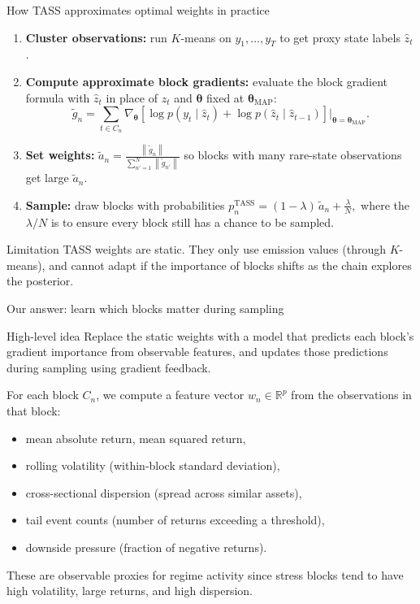 \documentclass[aspectratio=169]{beamer}
\newcommand{\norm}[1]{\left\lVert #1 \right\rVert}
\newcommand{\btheta}{\boldsymbol{\theta}}
\begin{document}
\begin{frame}{How TASS approximates optimal weights in practice}
  \begin{enumerate}
    \item \textbf{Cluster observations:} run $K$-means on $y_1, \ldots, y_T$ to get proxy state labels $\hat{z}_t$. 
    \item \textbf{Compute approximate block gradients:} evaluate the block gradient formula with $\hat{z}_t$ in place of $z_t$ and $\btheta$ fixed at $\btheta_{\mathrm{MAP}}$:
      \[
        \tilde{g}_n = \sum_{t \in C_n} \nabla_{\btheta} \left[\log p(y_t \mid \hat{z}_t) + \log p(\hat{z}_t \mid \hat{z}_{t-1})\right]\bigg|_{\btheta = \btheta_{\mathrm{MAP}}}.
      \]
    \item \textbf{Set weights:}
      $\displaystyle\tilde{a}_n = \frac{\norm{\tilde{g}_n}}{\sum_{n'=1}^{N}\norm{\tilde{g}_{n'}}}$ so blocks with many rare-state observations get large $\tilde{a}_n$.
    \item \textbf{Sample:} draw blocks with probabilities
      $\displaystyle p_n^{\mathrm{TASS}} = (1-\lambda)\,\tilde{a}_n + \frac{\lambda}{N},$ where the $\lambda/N$ is to ensure every block still has a chance to be sampled.
  \end{enumerate} 

  \vspace{0.3em}
  \begin{block}{Limitation}
    TASS weights are static. They only use emission values (through $K$-means), and cannot adapt if the importance of blocks shifts as the chain explores the posterior.
  \end{block}
\end{frame}

\begin{frame}{Our answer: learn which blocks matter during sampling}
    \begin{block}{High-level idea}
      Replace the static weights with a model that predicts each block's gradient importance from observable features, and updates those predictions during sampling using gradient feedback.
    \end{block}

  \vspace{0.5em}
  For each block $C_n$, we compute a feature vector $w_n \in \mathbb{R}^p$ from the observations in that block:
  \begin{itemize}
    \item mean absolute return, mean squared return,
    \item rolling volatility (within-block standard deviation),
    \item cross-sectional dispersion (spread across similar assets),
    \item tail event counts (number of returns exceeding a threshold),
    \item downside pressure (fraction of negative returns).
  \end{itemize}
  These are observable proxies for regime activity since stress blocks tend to have high volatility, large returns, and high dispersion.
\end{frame}
\end{document}
